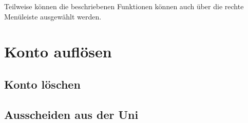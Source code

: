 Teilweise können die beschriebenen Funktionen können auch über die rechte Menüleiste ausgewählt werden.

\section{Konto auflösen}
\label{sec:kontoAufloesen} 
\subsection{Konto löschen} \label{subsec:kontoAufloesen}
\subsection{Ausscheiden aus der Uni} \label{subsec:kontoLoeschen}
